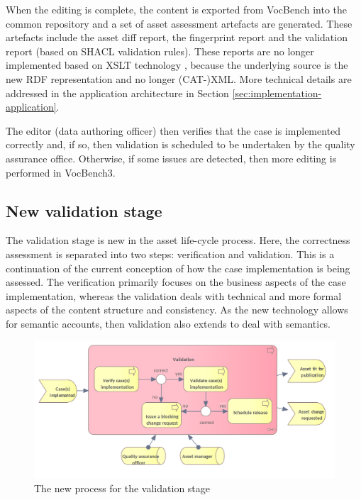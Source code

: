 	When the editing is complete, the content is exported from VocBench into the common repository and a set of asset assessment artefacts are generated. These artefacts include the asset diff report, the fingerprint report and the validation report (based on SHACL \citep{shacl-spec} validation rules). These reports are no longer implemented based on XSLT technology \citep{xslt3-Kay}, because the underlying source is the new RDF representation \citep{rdf11} and no longer (CAT-)XML. More technical details are addressed in the application architecture in Section \ref{sec:implementation-application}.
	
	The editor (data authoring officer) then verifies that the case is implemented correctly and, if so, then validation is scheduled to be undertaken by the quality assurance office. Otherwise, if some issues are detected, then more editing is performed in VocBench3.
		
	
	\subsection{New validation stage}
	\label{sec:validation-new}	
	
	The validation stage is new in the asset life-cycle process. Here, the correctness assessment is separated into two steps: verification and validation. This is a continuation of the current conception of how the case implementation is being assessed. The verification primarily focuses on the business aspects of the case implementation, whereas the validation deals with  technical and more formal aspects of the content structure and consistency. As the new technology allows for semantic accounts, then validation also extends to deal with semantics. 	 

	\begin{figure}[h]
		\centering
		\includegraphics[width=.892\textwidth]{images/business/new/Validation.png}
		\caption{The new process for the validation stage}
		\label{fig:validation-new}
	\end{figure}

